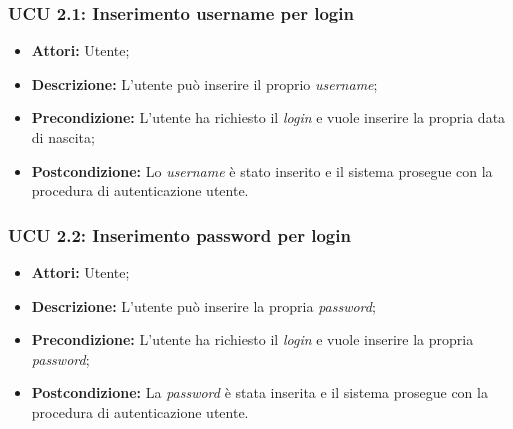 \hypertarget{U2.1}{}
\subsubsection{UCU 2.1: Inserimento username per login}
\begin{itemize}
\item \textbf{Attori:} Utente;
\item \textbf{Descrizione:} L'utente può inserire il proprio \textit{username};
\item \textbf{Precondizione:} L'utente ha richiesto il \textit{login} e vuole inserire la propria data di nascita;
\item \textbf{Postcondizione:} Lo \textit{username} è stato inserito e il sistema prosegue con la procedura di autenticazione utente.
\end{itemize}

\hypertarget{U2.2}{}
\subsubsection{UCU 2.2: Inserimento password per login}
\begin{itemize}
\item \textbf{Attori:} Utente;
\item \textbf{Descrizione:} L'utente può inserire la propria \textit{password};
\item \textbf{Precondizione:} L'utente ha richiesto il \textit{login} e vuole inserire la propria \textit{password};
\item \textbf{Postcondizione:} La \textit{password} è stata inserita e il sistema prosegue con la procedura di autenticazione utente.
\end{itemize}

\hypertarget{L0}{}
